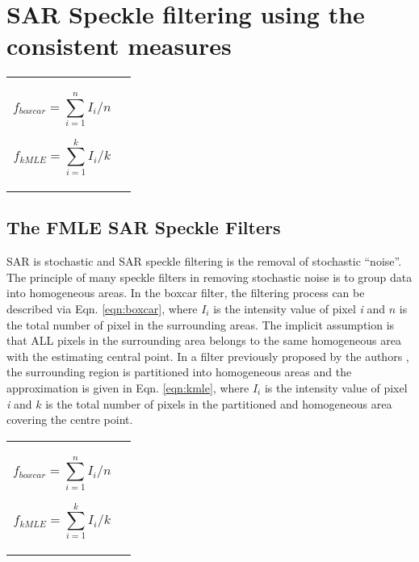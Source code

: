 \section{SAR Speckle filtering using the consistent measures}

\begin{tabular}{c c}
\begin{minipage}[c]{0.45\textwidth}
\begin{equation}
\label{eqn:boxcar}
f_{boxcar} = \displaystyle{\sum_{i=1}^n{I_i}} / n 
\end{equation}
\end{minipage}
\begin{minipage}[c]{0.45\textwidth}
\begin{equation}
\label{eqn:kmle}
f_{kMLE }= \displaystyle{\sum_{i=1}^k{I_i} } / k 
\end{equation}
\end{minipage}
\end{tabular}

\subsection{The FMLE SAR Speckle Filters}

SAR is stochastic and SAR speckle filtering is the removal of stochastic ``noise''.
The principle of many speckle filters in removing stochastic noise is to group data into homogeneous areas.
In the boxcar filter, the filtering process can be described via Eqn. \ref{eqn:boxcar}, 
where 
	$I_i$ is the intensity value of pixel \textit{i} and
	$n$ is the total number of pixel in the surrounding areas.
The implicit assumption is that ALL pixels in the surrounding area belongs to the same homogeneous area with the estimating central point.
In a filter previously proposed by the authors \citep{Le_2010_ACRS}, the surrounding region is partitioned into homogeneous areas and the approximation is given in Eqn. \ref{eqn:kmle},
where 
	$I_i$ is the intensity value of pixel \textit{i} and
	$k$ is the total number of pixels in the partitioned and homogeneous area covering the centre point.

\begin{tabular}{c c}
\begin{minipage}[c]{0.45\textwidth}
\begin{equation}
\label{eqn:boxcar}
f_{boxcar} = \displaystyle{\sum_{i=1}^n{I_i}} / n 
\end{equation}
\end{minipage}
\begin{minipage}[c]{0.45\textwidth}
\begin{equation}
\label{eqn:kmle}
f_{kMLE }= \displaystyle{\sum_{i=1}^k{I_i} } / k 
\end{equation}
\end{minipage}
\end{tabular}

